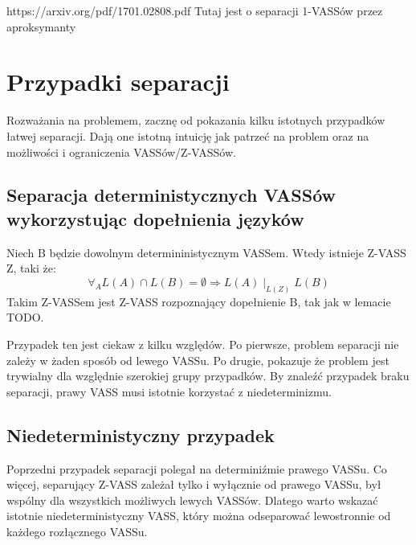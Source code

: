 %


    https://arxiv.org/pdf/1701.02808.pdf
    Tutaj jest o separacji 1-VASSów przez aproksymanty





    \chapter{Przypadki separacji}
    Rozważania na problemem, zacznę od pokazania kilku istotnych przypadków łatwej separacji.
    Dają one istotną intuicję jak patrzeć na problem oraz na możliwości i ograniczenia VASSów/Z-VASSów.


    \section{Separacja deterministycznych VASSów wykorzystując dopełnienia języków}
    \begin{example}
        Niech B będzie dowolnym determininistycznym VASSem.
        Wtedy istnieje Z-VASS Z, taki że:
        \[\forall_A L(A) \cap L(B) = \emptyset \Rightarrow L(A) \mid_{L(Z)} L(B)\]
        Takim Z-VASSem jest Z-VASS rozpoznający dopełnienie B, tak jak w lemacie TODO.

    \end{example}
    Przypadek ten jest ciekaw z kilku względów.
    Po pierwsze, problem separacji nie zależy w żaden sposób od lewego VASSu.
    Po drugie, pokazuje że problem jest trywialny dla względnie szerokiej grupy przypadków.
    By znaleźć przypadek braku separacji, prawy VASS musi istotnie korzystać z niedeterminizmu.


    \section{Niedeterministyczny przypadek}
    Poprzedni przypadek separacji polegał na determiniźmie prawego VASSu.
    Co więcej, separujący Z-VASS zależał tylko i wyłącznie od prawego VASSu, był wspólny dla wszystkich możliwych lewych VASSów.
    Dlatego warto wskazać istotnie niedeterministyczny VASS, który można odseparować lewostronnie od każdego rozłącznego VASSu.


